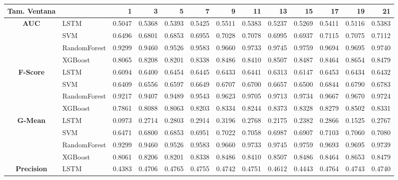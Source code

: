 \begin{table}[h]
	\centering
	\begin{adjustbox}{max width=15cm}
		\begin{tabular}{|c|l|r|r|r|r|r|r|r|r|r|r|r|}
			\hline
			\textbf{Tam. Ventana}&         &      1  &      3  &      5  &      7  &      9  &      11 &      13 &      15 &      17 &      19 &      21 \\
			\hline
			\textbf{AUC} & LSTM &  0.5047 &  0.5368 &  0.5393 &  0.5425 &  0.5511 &  0.5383 &  0.5237 &  0.5269 &  0.5411 &  0.5116 &  0.5383 \\
			& SVM &  0.6496 &  0.6801 &  0.6853 &  0.6955 &  0.7028 &  0.7078 &  0.6995 &  0.6937 &  0.7115 &  0.7075 &  0.7112 \\
			& RandomForest &  0.9299 &  0.9460 &  0.9526 &  0.9583 &  0.9660 &  0.9733 &  0.9745 &  0.9759 &  0.9694 &  0.9695 &  0.9740 \\
			& XGBoost &  0.8065 &  0.8208 &  0.8201 &  0.8338 &  0.8486 &  0.8410 &  0.8507 &  0.8487 &  0.8464 &  0.8654 &  0.8479 \\
			\hline
			\textbf{F-Score} & LSTM &  0.6094 &  0.6400 &  0.6454 &  0.6445 &  0.6433 &  0.6441 &  0.6313 &  0.6147 &  0.6453 &  0.6434 &  0.6432 \\
			& SVM &  0.6409 &  0.6556 &  0.6597 &  0.6649 &  0.6707 &  0.6700 &  0.6657 &  0.6500 &  0.6844 &  0.6790 &  0.6783 \\
			& RandomForest &  0.9217 &  0.9407 &  0.9489 &  0.9543 &  0.9623 &  0.9705 &  0.9713 &  0.9734 &  0.9667 &  0.9670 &  0.9724 \\
			& XGBoost &  0.7861 &  0.8088 &  0.8063 &  0.8203 &  0.8334 &  0.8244 &  0.8373 &  0.8328 &  0.8279 &  0.8502 &  0.8331 \\
			\hline
			\textbf{G-Mean} & LSTM &  0.0973 &  0.2714 &  0.2803 &  0.2914 &  0.3196 &  0.2768 &  0.2175 &  0.2382 &  0.2866 &  0.1525 &  0.2767 \\
			& SVM &  0.6471 &  0.6800 &  0.6853 &  0.6951 &  0.7022 &  0.7058 &  0.6987 &  0.6907 &  0.7103 &  0.7060 &  0.7080 \\
			& RandomForest &  0.9299 &  0.9460 &  0.9526 &  0.9583 &  0.9660 &  0.9733 &  0.9745 &  0.9759 &  0.9693 &  0.9695 &  0.9739 \\
			& XGBoost &  0.8061 &  0.8206 &  0.8201 &  0.8338 &  0.8486 &  0.8410 &  0.8507 &  0.8486 &  0.8464 &  0.8653 &  0.8479 \\
			\hline
			\textbf{Precision} & LSTM &  0.4383 &  0.4706 &  0.4765 &  0.4755 &  0.4742 &  0.4751 &  0.4612 &  0.4443 &  0.4764 &  0.4743 &  0.4740 \\

\end{tabular}
\end{adjustbox}
\end{table}
